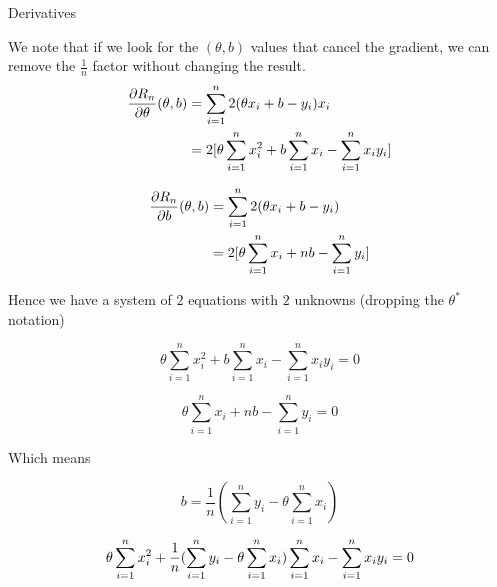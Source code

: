 \documentclass[usenames,dvipsnames]{beamer}
\begin{document}
\begin{frame}{Derivatives}

    We note that if we look for the $(\theta, b)$ values that cancel the gradient, we can remove the $\frac{1}{n}$ factor without changing the result.
    \begin{equation}
    \begin{aligned}
        \label{eq:}
        \frac{\partial R_n}{\partial \theta}(\theta, b) &= \sum_{i=1}^{n} 2(\theta x_i+b-y_i)x_i\\
        &= 2\Large[\theta \sum_{i=1}^{n} x_i^2 + b\sum_{i=1}^{n} x_i - \sum_{i=1}^{n} x_i y_i \Large]\\
    \end{aligned}
    \end{equation}


    \begin{equation}
    \begin{aligned}
        \label{eq:}
        \frac{\partial R_n}{\partial b}(\theta, b) &= \sum_{i=1}^{n} 2(\theta x_i+b-y_i)\\
        &= 2\Large[\theta \sum_{i=1}^{n} x_i + nb- \sum_{i=1}^{n} y_i \Large]\\
    \end{aligned}
    \end{equation}
\end{frame}

\begin{frame}{}
    Hence we have a system of $2$ equations with $2$ unknowns (dropping the $\theta^*$ notation)

    \begin{equation}
        \theta \sum_{i=1}^{n} x_i^2 + b\sum_{i=1}^{n} x_i - \sum_{i=1}^{n} x_i y_i = 0
    \end{equation}

    \begin{equation}
        \theta \sum_{i=1}^{n} x_i + nb- \sum_{i=1}^{n} y_i = 0
    \end{equation}
\end{frame}

\begin{frame}{}
    Which means

    \begin{equation}
        b =  \frac{1}{n}(\sum_{i=1}^{n} y_i -\theta \sum_{i=1}^{n} x_i)
    \end{equation}

    \begin{equation}
        \theta \sum_{i=1}^{n} x_i^2 + \frac{1}{n}\large(\sum_{i=1}^{n} y_i -\theta \sum_{i=1}^{n} x_i \large)\sum_{i=1}^{n} x_i - \sum_{i=1}^{n} x_i y_i = 0
    \end{equation}

\end{frame}
\end{document}
